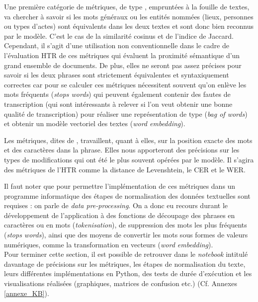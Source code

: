 Une première catégorie de métriques, de type , empruntées à la fouille de textes, va chercher à savoir si les mots généraux ou les entités nommées (lieux, personnes ou types d'actes) sont équivalents dans les deux textes et sont donc bien reconnus par le modèle. C'est le cas de la similarité cosinus et de l'indice de Jaccard. Cependant, il s'agit d'une utilisation non conventionnelle dans le cadre de l'évaluation HTR de ces métriques qui évaluent la proximité sémantique d'un grand ensemble de documents. De plus, elles ne seront pas assez précises pour savoir si les deux phrases sont strictement équivalentes et syntaxiquement correctes car pour se calculer ces métriques nécessitent souvent qu'on enlève les mots fréquents (\textit{stops words}) qui peuvent également contenir des fautes de transcription (qui sont intéressants à relever si l'on veut obtenir une bonne qualité de transcription) pour réaliser une représentation de type  (\textit{bag of words}) et obtenir un modèle vectoriel des textes (\textit{word embedding}).

Les métriques, dites de , travaillent, quant à elles, sur la position exacte des mots et des caractères dans la phrase. Elles nous apporteront des précisions sur les types de modifications qui ont été le plus souvent opérées par le modèle. Il s'agira des métriques  de l'HTR comme la distance de Levenshtein, le CER et le WER.

Il faut noter que pour permettre l'implémentation de ces métriques dans un programme informatique des étapes de normalisation des données textuelles sont requises : on parle de \textit{data pre-processing}. On a donc eu recours durant le développement de l'application à des fonctions de découpage des phrases en caractères ou en mots (\textit{tokenisation}), de suppression des mots les plus fréquents (\textit{stops words}), ainsi que des moyens de convertir les mots sous formes de valeurs numériques, comme la transformation en vecteurs (\textit{word embedding}).\\

Pour terminer cette section, il est possible de retrouver dans le \textit{notebook} intitulé  davantage de précisions sur les métriques, les étapes de normalisation du texte, leurs différentes implémentations en Python, des tests de durée d'exécution et les visualisations réalisées (graphiques, matrices de confusion etc.) (Cf. Annexes \ref{annexe_KB}).\\
\clearpage
\thispagestyle{empty}
